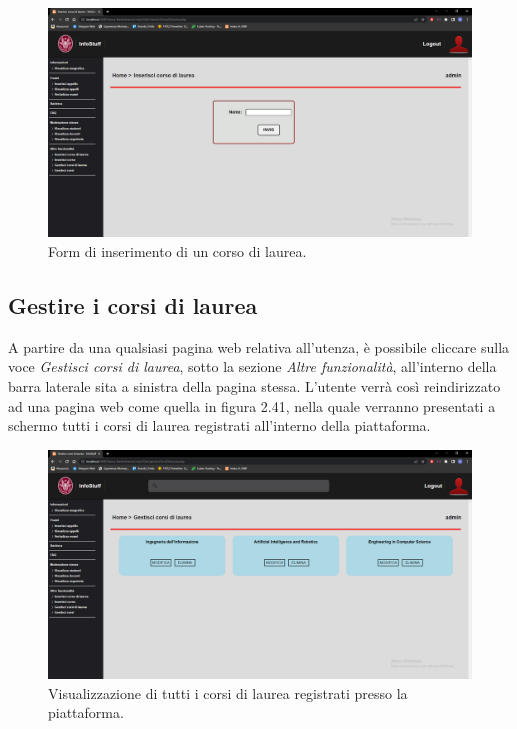 \documentclass [a4paper,11pt]{book}
\begin{document}
\begin{figure}
\centering
\includegraphics[scale=0.3]{figura2-40.png}
\caption{Form di inserimento di un corso di laurea.}
\end{figure}

\medskip

\subsection{Gestire i corsi di laurea}

A partire da una qualsiasi pagina web relativa all'utenza, è possibile cliccare sulla voce \emph{Gestisci corsi di laurea}, sotto la sezione \emph{Altre funzionalità}, all'interno della barra laterale sita a sinistra della pagina stessa. L'utente verrà così reindirizzato ad una pagina web come quella in figura 2.41, nella quale verranno presentati a schermo tutti i corsi di laurea registrati all'interno della piattaforma.

\begin{figure}
\centering
\includegraphics[scale=0.3]{figura2-41.png}
\caption{Visualizzazione di tutti i corsi di laurea registrati presso la piattaforma.}
\end{figure}
\end{document}
